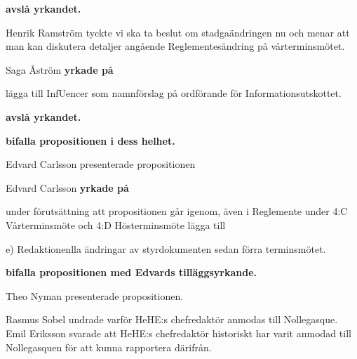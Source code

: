 \documentclass[10pt]{article}
\begin{document}
\begin{paragrafer}
\begin{paragrafer}
      \textbf{\Mba avslå yrkandet.}


      Henrik Ramström tyckte vi ska ta beslut om stadgaändringen nu och menar att man kan diskutera detaljer angående Reglementesändring på vårterminsmötet.

      Saga Åström \textbf{yrkade på}
      \begin{attsatser}
        \att lägga till InfUencer som namnförslag på ordförande för Informationsutskottet.
      \end{attsatser}

      \textbf{\Mba avslå yrkandet.}
      

      \textbf{\Mba bifalla propositionen i dess helhet.}




        Edvard Carlsson presenterade propositionen
        
        Edvard Carlsson \textbf{yrkade på}
        \begin{attsatser}
          \att under förutsättning att propositionen går igenom, även i Reglemente under 4:C Vårterminsmöte och 4:D Hösterminsmöte lägga till
              \begin{dashlist}
                \item e) Redaktionenlla ändringar av styrdokumenten sedan förra terminsmötet.
              \end{dashlist}
        \end{attsatser}


        \textbf{\Mba bifalla propositionen med Edvards tilläggsyrkande.}


        Theo Nyman presenterade propositionen. 

        Rasmus Sobel undrade varför HeHE:s chefredaktör anmodas till Nollegasque. Emil Eriksson svarade att HeHE:s chefredaktör historiskt har varit anmodad till Nollegasquen för att kunna rapportera därifrån.


\end{paragrafer}
\end{paragrafer}
\end{document}

